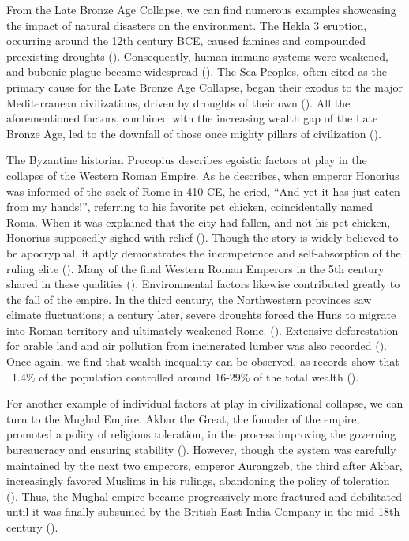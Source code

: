 From the Late Bronze Age Collapse, we can find numerous examples showcasing the impact of natural disasters on the environment. The Hekla 3 eruption, occurring around the 12th century BCE, caused famines and compounded preexisting droughts (\cites[p.\ 340]{baker1995hekla}[pp.\ 456–458]{yurko1999end}[p.\ 719]{manning2023hittite}). Consequently, human immune systems were weakened, and bubonic plague became widespread (\cite[p.\ 1]{spyrou2018plague}). The Sea Peoples, often cited as the primary cause for the Late Bronze Age Collapse, began their exodus to the major Mediterranean civilizations, driven by droughts of their own (\cite[pp.\ 16–17]{carpenter1966discontinuity}). All the aforementioned factors, combined with the increasing wealth gap of the Late Bronze Age, led to the downfall of those once mighty pillars of civilization (\cites[pp.\ 20–22]{basri2020wealth}{weisweiler2022inequality}). 

The Byzantine historian Procopius describes egoistic factors at play in the collapse of the Western Roman Empire. As he describes, when emperor Honorius was informed of the sack of Rome in 410 CE, he cried, “And yet it has just eaten from my hands!”, referring to his favorite pet chicken, coincidentally named Roma. When it was explained that the city had fallen, and not his pet chicken, Honorius supposedly sighed with relief (\cite{procopius1916vandalic}). Though the story is widely believed to be apocryphal, it aptly demonstrates the incompetence and self-absorption of the ruling elite (\cite[p.\ 643]{gibbon1845decline}). Many of the final Western Roman Emperors in the 5th century shared in these qualities (\cite{britannica2024majorian}). Environmental factors likewise contributed greatly to the fall of the empire. In the third century, the Northwestern provinces saw climate fluctuations; a century later, severe droughts forced the Huns to migrate into Roman territory and ultimately weakened Rome. (\cite[pp.\ 190–191]{mccormick2012climate}). Extensive deforestation for arable land and air pollution from incinerated lumber was also recorded (\cites[p.\ 173]{harris2013ancient}[p.\ 171]{erskine2012companion}). Once again, we find that wealth inequality can be observed, as records show that ~1.4\% of the population controlled around 16-29\% of the total wealth (\cite[p.\ 76]{scheidel2009size}).

For another example of individual factors at play in civilizational collapse, we can turn to the Mughal Empire. Akbar the Great, the founder of the empire, promoted a policy of religious toleration, in the process improving the governing bureaucracy and ensuring stability (\cites{ballhatchet2024akbar}[p.\ 159]{stein2010historyindia}). However, though the system was carefully maintained by the next two emperors, emperor Aurangzeb, the third after Akbar, increasingly favored Muslims in his rulings, abandoning the policy of toleration (\cite[p.\ 183]{pletcher2010historyindia}). Thus, the Mughal empire became progressively more fractured and debilitated until it was finally subsumed by the British East India Company in the mid-18th century (\cites[p.\ 8]{blanton2020moral}{nationaltrust2024eastindia}). 

